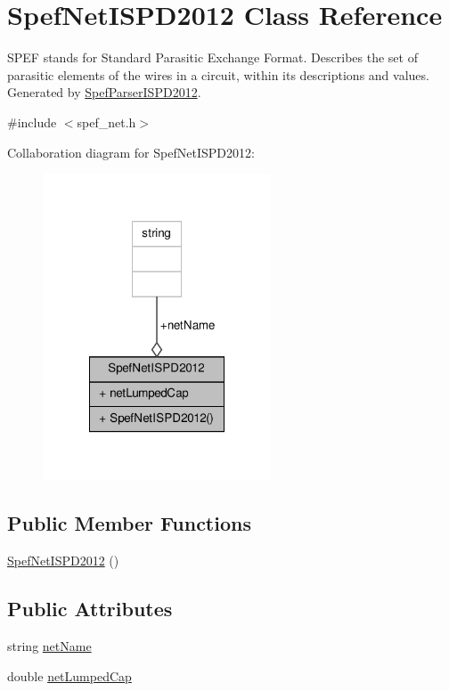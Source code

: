 \hypertarget{classSpefNetISPD2012}{\section{Spef\-Net\-I\-S\-P\-D2012 Class Reference}
\label{classSpefNetISPD2012}
}


S\-P\-E\-F stands for Standard Parasitic Exchange Format. Describes the set of parasitic elements of the wires in a circuit, within its descriptions and values. Generated by \hyperlink{classSpefParserISPD2012}{Spef\-Parser\-I\-S\-P\-D2012}.  




{\ttfamily \#include $<$spef\-\_\-net.\-h$>$}



Collaboration diagram for Spef\-Net\-I\-S\-P\-D2012\-:\nopagebreak
\begin{figure}[H]
\begin{center}
\leavevmode
\includegraphics[width=192pt]{classSpefNetISPD2012__coll__graph}
\end{center}
\end{figure}
\subsection*{Public Member Functions}
\begin{DoxyCompactItemize}
\item 
\hyperlink{classSpefNetISPD2012_a8675a89136dbf26981327f8860a95506}{Spef\-Net\-I\-S\-P\-D2012} ()
\end{DoxyCompactItemize}
\subsection*{Public Attributes}
\begin{DoxyCompactItemize}
\item 
string \hyperlink{classSpefNetISPD2012_aed87a4b73a2ad09be841c9b8ab222ad5}{net\-Name}
\item 
double \hyperlink{classSpefNetISPD2012_ae0a1b7a236104b7a6be70fc977fe20e7}{net\-Lumped\-Cap}
\end{DoxyCompactItemize}


